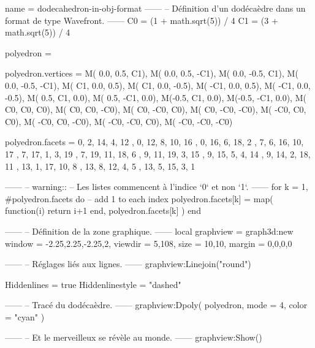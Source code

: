 \documentclass[border = 3pt]{standalone}
\begin{document}
\begin{luadraw}{name = dodecahedron-in-obj-format}
------
-- Définition d'un dodécaèdre dans un format de type Wavefront.
------
C0 = (1 + math.sqrt(5)) / 4
C1 = (3 + math.sqrt(5)) / 4

polyedron = {}

polyedron.vertices = {
  M( 0.0,  0.5,   C1),
  M( 0.0,  0.5,  -C1),
  M( 0.0, -0.5,   C1),
  M( 0.0, -0.5,  -C1),
  M(  C1,  0.0,  0.5),
  M(  C1,  0.0, -0.5),
  M( -C1,  0.0,  0.5),
  M( -C1,  0.0, -0.5),
  M( 0.5,   C1,  0.0),
  M( 0.5,  -C1,  0.0),
  M(-0.5,   C1,  0.0),
  M(-0.5,  -C1,  0.0),
  M(  C0,   C0,   C0),
  M(  C0,   C0,  -C0),
  M(  C0,  -C0,   C0),
  M(  C0,  -C0,  -C0),
  M( -C0,   C0,   C0),
  M( -C0,   C0,  -C0),
  M( -C0,  -C0,   C0),
  M( -C0,  -C0,  -C0)
}

polyedron.facets  = {
  {  0,  2, 14,  4, 12 },
  {  0, 12,  8, 10, 16 },
  {  0, 16,  6, 18,  2 },
  {  7,  6, 16, 10, 17 },
  {  7, 17,  1,  3, 19 },
  {  7, 19, 11, 18,  6 },
  {  9, 11, 19,  3, 15 },
  {  9, 15,  5,  4, 14 },
  {  9, 14,  2, 18, 11 },
  { 13,  1, 17, 10,  8 },
  { 13,  8, 12,  4,  5 },
  { 13,  5, 15,  3,  1 }
}

------
-- warning::
--     Les listes \lua commencent à l'indice `0` et non `1`.
------
for k = 1, #polyedron.facets do  -- add 1 to each index
  polyedron.facets[k] = map(
    function(i)
      return i+1
    end,
    polyedron.facets[k]
  )
end

------
-- Définition de la zone graphique.
------
local graphview = graph3d:new{
  window  = {-2.25,2.25,-2.25,2},
  viewdir = {5,108},
  size    = {10,10},
  margin  = {0,0,0,0}
}

------
-- Réglages liés aux lignes.
------
graphview:Linejoin("round")

Hiddenlines     = true
Hiddenlinestyle = "dashed"

------
-- Tracé du dodécaèdre.
------
graphview:Dpoly(
  polyedron,
  {
    mode  = 4,
    color = "cyan"
  })

------
-- Et le merveilleux se révèle au monde.
------
graphview:Show()
\end{luadraw}
\end{document}
